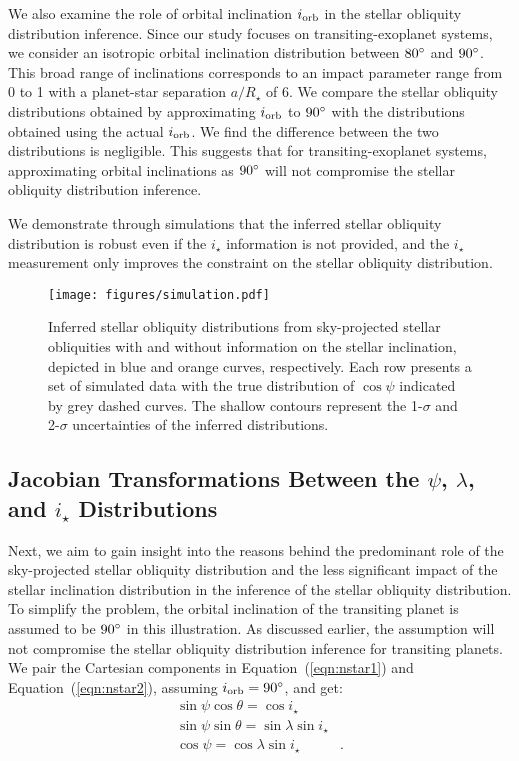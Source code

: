 \documentclass[twocolumn,times,linenumbers]{aastex631}
\begin{document}
We also examine the role of orbital inclination $i_{\rm orb}$ in the stellar obliquity distribution inference. Since our study focuses on transiting-exoplanet systems, we consider an isotropic orbital inclination distribution between $80\mbox{$^\circ$}$ and $90\mbox{$^\circ$}$. This broad range of inclinations corresponds to an impact parameter range from 0 to 1 with a planet-star separation $a/R_\star$ of 6.
We compare the stellar obliquity distributions obtained by approximating $i_{\rm orb}$ to $90\mbox{$^\circ$}$ with the distributions obtained using the actual $i_{\rm orb}$. We find the difference between the two distributions is negligible. This suggests that for transiting-exoplanet systems, approximating orbital inclinations as $90\mbox{$^\circ$}$ will not compromise the stellar obliquity distribution inference.

We demonstrate through simulations that the inferred stellar obliquity distribution is robust even if the $i_\star$ information is not provided, and the $i_\star$ measurement only improves the constraint on the stellar obliquity distribution.

\begin{figure}[ht!]
    \centering
    \texttt{[image: figures/simulation.pdf]}
    \caption{Inferred stellar obliquity distributions from sky-projected stellar obliquities with and without information on the stellar inclination, depicted in blue and orange curves, respectively. Each row presents a set of simulated data with the true distribution of $\cos{\psi}$ indicated by grey dashed curves. The shallow contours represent the 1-$\sigma$ and 2-$\sigma$ uncertainties of the inferred distributions.}
    \label{fig:simulation}
\end{figure}

\subsection{Jacobian Transformations Between the $\psi$, $\lambda$, and \lowercase{$i_\star$} Distributions}\label{subsec:jacobian}

Next, we aim to gain insight into the reasons behind the predominant role of the sky-projected stellar obliquity distribution and the less significant impact of the stellar inclination distribution in the inference of the stellar obliquity distribution. To simplify the problem, the orbital inclination of the transiting planet is assumed to be $90\mbox{$^\circ$}$ in this illustration. As discussed earlier, the assumption will not compromise the stellar obliquity distribution inference for transiting planets.
We pair the Cartesian components in Equation~(\ref{eqn:nstar1}) and Equation~(\ref{eqn:nstar2}), assuming $i_{\rm orb} = 90\mbox{$^\circ$}$, and get:
\begin{align}
    \sin{\psi}\cos{\theta} = \cos{i_\star}& \label{eq:coord1}\\
    \sin{\psi}\sin{\theta} = \sin{\lambda}\sin{i_\star}& \label{eq:coord2}\\
    \cos{\psi} = \cos{\lambda}\sin{i_\star} \label{eq:coord3}&.
\end{align}
\end{document}
